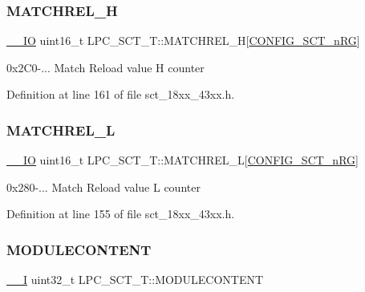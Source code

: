 \subsubsection{\texorpdfstring{M\+A\+T\+C\+H\+R\+E\+L\+\_\+H}{MATCHREL\_H}}
{\footnotesize\ttfamily \hyperlink{core__sc300_8h_aec43007d9998a0a0e01faede4133d6be}{\+\_\+\+\_\+\+IO} uint16\+\_\+t L\+P\+C\+\_\+\+S\+C\+T\+\_\+\+T\+::\+M\+A\+T\+C\+H\+R\+E\+L\+\_\+H\mbox{[}\hyperlink{group___s_c_t__18_x_x__43_x_x_ga8d80e251208a01483a6b00c81ecb7493}{C\+O\+N\+F\+I\+G\+\_\+\+S\+C\+T\+\_\+n\+RG}\mbox{]}}

0x2\+C0-\/... Match Reload value H counter 

Definition at line 161 of file sct\+\_\+18xx\+\_\+43xx.\+h.

\mbox{\label{struct_l_p_c___s_c_t___t_a277ca1931d44b5339f7ac4d583fca0d7}} 
\subsubsection{\texorpdfstring{M\+A\+T\+C\+H\+R\+E\+L\+\_\+L}{MATCHREL\_L}}
{\footnotesize\ttfamily \hyperlink{core__sc300_8h_aec43007d9998a0a0e01faede4133d6be}{\+\_\+\+\_\+\+IO} uint16\+\_\+t L\+P\+C\+\_\+\+S\+C\+T\+\_\+\+T\+::\+M\+A\+T\+C\+H\+R\+E\+L\+\_\+L\mbox{[}\hyperlink{group___s_c_t__18_x_x__43_x_x_ga8d80e251208a01483a6b00c81ecb7493}{C\+O\+N\+F\+I\+G\+\_\+\+S\+C\+T\+\_\+n\+RG}\mbox{]}}

0x280-\/... Match Reload value L counter 

Definition at line 155 of file sct\+\_\+18xx\+\_\+43xx.\+h.

\mbox{\label{struct_l_p_c___s_c_t___t_a77e94a24f92f46235780c2a52d9b524d}} 
\subsubsection{\texorpdfstring{M\+O\+D\+U\+L\+E\+C\+O\+N\+T\+E\+NT}{MODULECONTENT}}
{\footnotesize\ttfamily \hyperlink{core__sc300_8h_af63697ed9952cc71e1225efe205f6cd3}{\+\_\+\+\_\+I} uint32\+\_\+t L\+P\+C\+\_\+\+S\+C\+T\+\_\+\+T\+::\+M\+O\+D\+U\+L\+E\+C\+O\+N\+T\+E\+NT}

